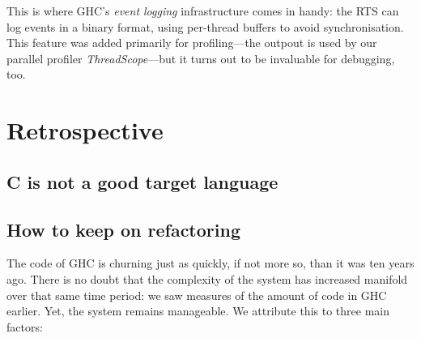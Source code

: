 \documentclass{article}
\begin{document}
This is where GHC's \emph{event logging} infrastructure comes in
handy: the RTS can log events in a binary format, using per-thread
buffers to avoid synchronisation.  This feature was added primarily
for profiling---the outpout is used by our parallel profiler
\emph{ThreadScope}---but it turns out to be invaluable for debugging,
too.

\section{Retrospective}

\subsection{C is not a good target language}

%
%
%
%

\subsection{How to keep on refactoring}

The code of GHC is churning just as quickly, if not more so, than it
was ten years ago.  There is no doubt that the complexity of the
system has increased manifold over that same time period: we saw
measures of the amount of code in GHC earlier.  Yet, the system
remains manageable.  We attribute this to three main factors:
\end{document}
